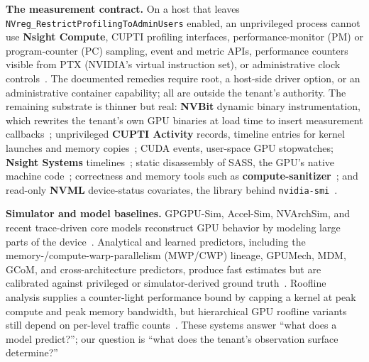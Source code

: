 \documentclass[conference]{IEEEtran}
\begin{document}
\textbf{The measurement contract.} On a host that leaves
\texttt{NVreg\_Restrict\allowbreak Profiling\allowbreak To\allowbreak Admin\allowbreak Users}
enabled, an unprivileged process cannot use \textbf{Nsight Compute}, CUPTI
profiling interfaces, performance-monitor (PM) or program-counter (PC)
sampling, event and metric APIs, performance counters visible from PTX
(NVIDIA's virtual instruction set), or administrative clock
controls~\cite{nvidia_errnvgpuctrperm,nvidia_nsightcompute,nvidia_cupti}. The documented
remedies require root, a host-side driver option, or an administrative
container capability; all are outside the tenant's authority. The remaining
substrate is thinner but real: \textbf{NVBit} dynamic binary instrumentation,
which rewrites the tenant's own GPU binaries at load time to insert
measurement callbacks~\cite{villa2019nvbit,stephenson2015sassi}; unprivileged
\textbf{CUPTI Activity} records, timeline entries for kernel launches and
memory copies~\cite{nvidia_cupti_activity}; CUDA events, user-space GPU
stopwatches; \textbf{Nsight Systems} timelines~\cite{nvidia_nsightsystems};
static disassembly of SASS, the GPU's native machine
code~\cite{nvidia_cudabinutils}; correctness and memory tools such as
\textbf{compute-sanitizer}~\cite{nvidia_computesanitizer}; and read-only
\textbf{NVML} device-status covariates, the library behind
\texttt{nvidia-smi}~\cite{nvidia_nvml}.

\textbf{Simulator and model baselines.} GPGPU-Sim, Accel-Sim, NVArchSim, and
recent trace-driven core models reconstruct GPU behavior by modeling large
parts of the device~\cite{bakhoda2009gpgpusim,khairy2020accelsim,villa2021nvarchsim,huerta2025moderncores}.
Analytical and learned predictors, including the memory-/compute-warp-parallelism
(MWP/CWP) lineage, GPUMech, MDM, GCoM, and cross-architecture predictors,
produce fast estimates but are calibrated against privileged or
simulator-derived ground
truth~\cite{hong2009analytical,huang2014gpumech,wang2020mdm,lee2022gcom,ardalani2015xapp,lee2025neusight}.
Roofline analysis supplies a counter-light performance bound by capping a
kernel at peak compute and peak memory bandwidth, but hierarchical
GPU roofline variants still depend on per-level traffic
counts~\cite{williams2009roofline,yang2020hierarchical}. These systems answer
``what does a model predict?''; our question is ``what does the tenant's
observation surface determine?''
\end{document}
